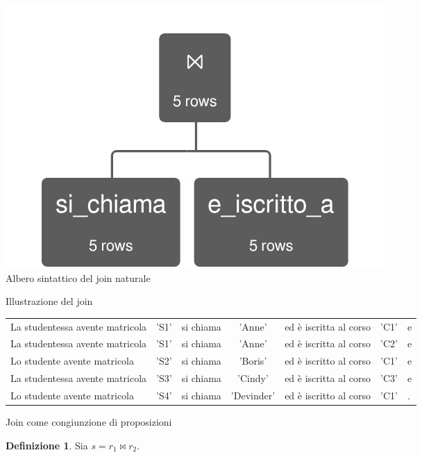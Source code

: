 \documentclass[withtimes]{easychair}
\theoremstyle{definition}
\newtheorem{definition}{Definizione}
\begin{document}
\begin{figure}[htp]
	\centering	
	\begin{subfigure}[t]{.75\textwidth}
		\centering
		\includegraphics[width=.4\textwidth]{img/inner_join}
		\caption{Albero sintattico del join naturale}\label{fig:inner-join-syn-tree}
	\end{subfigure}

	\vspace{1cm}	
		
	\begin{subfigure}[t]{\textwidth}
		\centering
		
      \caption{Illustrazione del join\label{fig:table-join-merge}}
	\end{subfigure}

	\vspace{1cm}	
	
	\begin{subfigure}[t]{\textwidth}
		\centering
\begin{tabular}{lclclcl}
La studentessa avente matricola & 'S1' & si chiama & 'Anne' & ed è iscritta al corso & 'C1' & e \\
La studentessa avente matricola & 'S1' & si chiama & 'Anne' & ed è iscritta al corso & 'C2' & e \\
Lo studente avente matricola & 'S2' & si chiama & 	'Boris'& ed è iscritto al corso & 'C1' & e \\
La studentessa avente matricola & 'S3' & si chiama & 'Cindy'& ed è iscritta al corso & 'C3' &  e \\
Lo studente avente matricola & 'S4' & si chiama & 'Devinder'& ed è iscritto al corso & 'C1' & . \\
\end{tabular}
\caption{Join come congiunzione di proposizioni}\label{fig:proposizioni-join}
	\end{subfigure}
		
	\vspace{1cm}	

	\begin{subfigure}[t]{\textwidth}
		\centering
		\begin{definition}
		Sia $s = r_1 \bowtie r_2$.


\end{definition}
\end{subfigure}
\end{figure}
\end{document}
